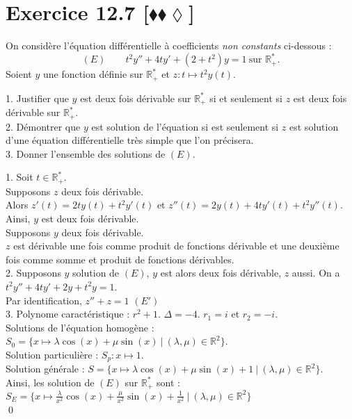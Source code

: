 \documentclass[10pt]{article}
\begin{document}
\section*{Exercice 12.7 [$\blacklozenge\blacklozenge\lozenge$]}
\begin{tcolorbox}[enhanced, width=7.5in, center, size=fbox, fontupper=\large, drop shadow southwest]
    On considère l'équation différentielle à coefficients \emph{non constants} ci-dessous :
    \begin{equation*}
        (E) \qquad t^2y'' + 4ty' + (2 + t^2)y = 1 ~ \text{sur }\mathbb{R}^*_+.
    \end{equation*}
    Soient $y$ une fonction définie sur $\mathbb{R}^*_+$ et $z:t\mapsto t^2y(t)$.
    \begin{adjustwidth}{0.2cm}{}
        1. Justifier que $y$ est deux fois dérivable sur $\mathbb{R}^*_+$ si et seulement si $z$ est deux fois dérivable sur $\mathbb{R}^*_+$.\\
        2. Démontrer que $y$ est solution de l'équation si est seulement si $z$ est solution d'une équation différentielle très simple que l'on précisera.\\
        3. Donner l'ensemble des solutions de $(E)$.
    \end{adjustwidth}
    1. Soit $t\in\mathbb{R}^*_+$.\\ 
    Supposons $z$ deux fois dérivable.\\
    Alors $z'(t) = 2ty(t) + t^2y'(t)$ et $z''(t) = 2y(t) + 4ty'(t) + t^2y''(t)$.\\
    Ainsi, $y$ est deux fois dérivable.\\[0.1cm]
    Supposons $y$ deux fois dérivable.\\
    $z$ est dérivable une fois comme produit de fonctions dérivable et une deuxième fois comme somme et produit de fonctions dérivables.\\[0.2cm]
    2. Supposons $y$ solution de $(E)$, $y$ est alors deux fois dérivable, $z$ aussi. On a $t^2y'' + 4ty' + 2y+t^2y=1$.\\
    Par identification, $z'' + z = 1$ $(E')$\\[0.2cm]
    3. Polynome caractéristique : $r^2 + 1$. $\Delta = -4$. $r_1 = i$ et $r_2 = -i$.\\
    Solutions de l'équation homogène : $S_0 = \{x\mapsto \lambda\cos(x) + \mu\sin(x) ~ | ~ (\lambda, \mu)\in\mathbb{R}^2\}$.\\
    Solution particulière : $S_p : x\mapsto 1$.\\
    Solution générale : $S = \{x\mapsto \lambda \cos(x) + \mu \sin(x) + 1 ~ | ~ (\lambda, \mu) \in \mathbb{R}^2\}$.\\
    Ainsi, les solution de $(E)$ sur $\mathbb{R}^*_+$ sont : $S_E = \{x\mapsto \frac{\lambda}{x^2}\cos(x) + \frac{\mu}{x^2}\sin(x) + \frac{1}{x^2} ~ | ~ (\lambda, \mu)\in\mathbb{R}^2\}$\\
    \qed
\end{tcolorbox}
\end{document}
